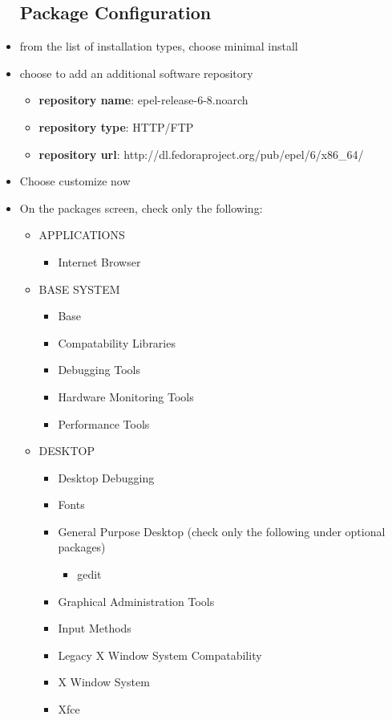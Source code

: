 \begin{itemize}
\subsection{Package Configuration}
\item{from the list of installation types, choose minimal install}
\item{choose to add an additional software repository}
\begin{itemize}
\item{\textbf{repository name}: epel-release-6-8.noarch}
\item{\textbf{repository type}: HTTP/FTP}
\item{\textbf{repository url}: http://dl.fedoraproject.org/pub/epel/6/x86\_64/}
\end{itemize}
\item{Choose customize now \con}
\item{On the packages screen, check only the following:}
\begin{itemize}
\item{APPLICATIONS}
	\begin{itemize}
	\item{Internet Browser}
	\end{itemize}
\item{BASE SYSTEM}
	\begin{itemize}
	\item{Base}
	\item{Compatability Libraries}
	\item{Debugging Tools}
	\item{Hardware Monitoring Tools}
	\item{Performance Tools}
	\end{itemize}
\item{DESKTOP}
	\begin{itemize}
	\item{Desktop Debugging}
	\item{Fonts}
	\item{General Purpose Desktop (check only the following under optional packages)}
		\begin{itemize}
		\item{gedit}
		\end{itemize}
	\item{Graphical Administration Tools}
	\item{Input Methods}
	\item{Legacy X Window System Compatability}
	\item{X Window System}
	\item{Xfce}

\end{itemize}
\end{itemize}
\end{itemize}
